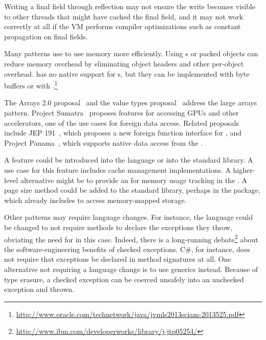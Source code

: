 
Writing a final field through reflection may not ensure
the write becomes visible to other threads that might have cached the final
field, and it may not work correctly at all if the VM performs compiler
optimizations such as constant propagation on final fields.

Many patterns use \unsafe{} to use memory more efficiently.
Using s or packed objects can reduce memory overhead by eliminating object headers and other per-object overhead.
\java{} has no native support for s,
but they can be implemented with byte buffers or with \jni{}.\footnote{\url{http://www.oracle.com/technetwork/java/jvmls2013sciam-2013525.pdf}}

The Arrays 2.0 proposal~\citep{arrays20} and
the value types proposal~\citep{valuetypes} address the large arrays pattern.
Project Sumatra~\citep{layouts} proposes features for accessing GPUs
and other accelerators,
one of the use cases for foreign data access.
Related proposals include JEP 191~\citep{jep191},
which proposes a new foreign function interface for \java{},
and Project Panama~\citep{panama}, which supports native data access from the \jvm{}.

A  feature could be introduced into the language or into the standard library.
A use case for this feature includes cache management implementations.
A higher-level alternative might be to provide an \api{} for memory usage tracking in the \jvm{}.
A page size method could be added to the standard library,
perhaps in the  package,
which already includes  to access memory-mapped storage.

Other patterns may require \java{} language changes.
For instance, 
the language could be changed to not require methods to declare the exceptions they throw,
obviating the need for \unsafe{} in this case.
Indeed, there is a long-running debate\footnote{\url{http://www.ibm.com/developerworks/library/j-jtp05254/}} about the software-engineering benefits of checked exceptions.
C\#, for instance, does not require that exceptions be declared in method signatures at all.
One alternative not requiring a language change
is to use \java{} generics
instead.
Because of type erasure, a checked exception can be coerced unsafely into an unchecked exception and thrown.

